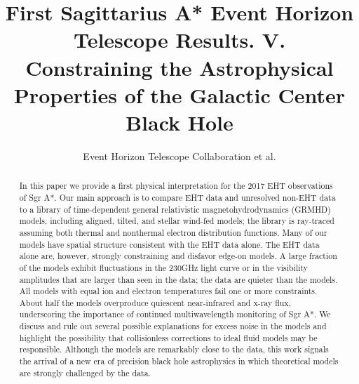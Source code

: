 \documentclass[twocolumn,twocolappendix,tighten,dvipsnames,linenumbers]{aastex63}
\begin{document}
\title{First Sagittarius A* Event Horizon Telescope Results. V.\\
  Constraining the Astrophysical Properties of the Galactic Center Black Hole}

%
\author{Event Horizon Telescope Collaboration et al.}


\received{\today}
\revised{\today}

\begin{abstract}

In this paper we provide a first physical interpretation for the 2017 EHT observations of Sgr A*.  Our main approach is to compare EHT data and unresolved non-EHT data to a library of time-dependent general relativistic magnetohydrodynamics (GRMHD) models, including aligned, tilted, and stellar wind-fed models; the library is ray-traced assuming both thermal and nonthermal electron distribution functions.  Many of our models have  spatial structure consistent with the EHT data alone.  The EHT data alone are, however, strongly constraining and disfavor edge-on models.  A large fraction of the models exhibit fluctuations in the $230$GHz light curve or in the visibility amplitudes that are larger than seen in the data; the data are quieter than the models.  All models with equal ion and electron temperatures fail one or more constraints.  About half the  models overproduce quiescent near-infrared and x-ray flux, underscoring the importance of continued multiwavelength monitoring of Sgr A*.  We discuss and rule out several possible explanations for excess noise in the models and highlight the possibility that collisionless corrections to ideal fluid models may be responsible.  Although the models are remarkably close to the data, this work signals the arrival of a new era of precision black hole astrophysics in which theoretical models are strongly challenged by the data.   


  \color{BrickRed}




\end{abstract}
\end{document}
